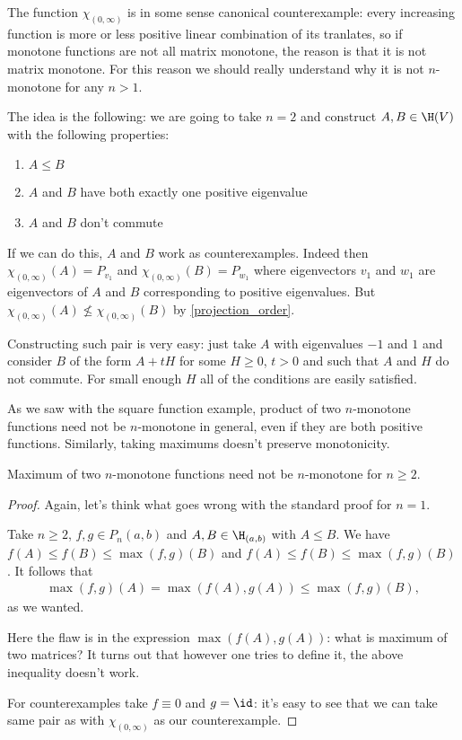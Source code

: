 The function $\chi_{(0, \infty)}$ is in some sense canonical counterexample: every increasing function is more or less positive linear combination of its tranlates, so if monotone functions are not all matrix monotone, the reason is that it is not matrix monotone. For this reason we should really understand why it is not $n$-monotone for any $n > 1$.

The idea is the following: we are going to take $n = 2$ and construct $A, B \in \H(V)$ with the following properties:
\begin{enumerate}
	\item $A \leq B$
	\item $A$ and $B$ have both exactly one positive eigenvalue
	\item $A$ and $B$ don't commute
\end{enumerate}
If we can do this, $A$ and $B$ work as counterexamples. Indeed then $\chi_{(0, \infty)}(A) = P_{v_{1}}$ and $\chi_{(0, \infty)}(B) = P_{w_{1}}$ where eigenvectors $v_{1}$ and $w_{1}$ are eigenvectors of $A$ and $B$ corresponding to positive eigenvalues. But $\chi_{(0, \infty)}(A) \not\leq \chi_{(0, \infty)}(B)$ by \ref{projection_order}.

Constructing such pair is very easy: just take $A$ with eigenvalues $-1$ and $1$ and consider $B$ of the form $A + t H$ for some $H \geq 0$, $t > 0$ and such that $A$ and $H$ do not commute. For small enough $H$ all of the conditions are easily satisfied.

As we saw with the square function example, product of two $n$-monotone functions need not be $n$-monotone in general, even if they are both positive functions. Similarly, taking maximums doesn't preserve monotonicity.

\begin{prop}
	Maximum of two $n$-monotone functions need not be $n$-monotone for $n \geq 2$.
\end{prop}
\begin{proof}
	Again, let's think what goes wrong with the standard proof for $n = 1$.

	Take $n \geq 2$, $f, g \in P_{n}(a, b)$ and $A, B \in \H_{(a, b)}$ with $A \leq B$. We have $f(A) \leq f(B) \leq \max(f, g)(B)$ and $f(A) \leq f(B) \leq \max(f, g)(B)$. It follows that
	\begin{align*}
		\max(f, g)(A) = \max(f(A), g(A)) \leq \max(f, g)(B),
	\end{align*}
	as we wanted.

	Here the flaw is in the expression $\max(f(A), g(A))$: what is maximum of two matrices? It turns out that however one tries to define it, the above inequality doesn't work.

	For counterexamples take $f \equiv 0$ and $g = \id$: it's easy to see that we can take same pair as with $\chi_{(0, \infty)}$ as our counterexample.
\end{proof}

